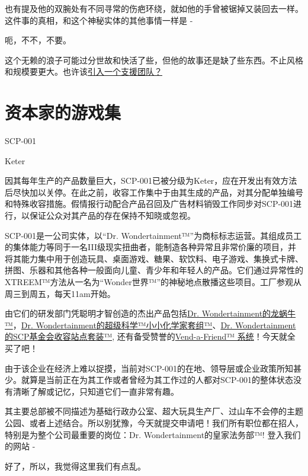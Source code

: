 也有提及他的双腕处有不同寻常的伤疤环绕，就如他的手曾被锯掉又装回去一样。这件事的真相，和这个神秘实体的其他事情一样是 -

呃，不不，不要。

这个无赖的浪子可能过分世故和快活了些，但他的故事还是缺了些东西。不止风格和规模要更大。也许该\hyperref[sec:SCP-001.a.simple.toymaker.offset.2]{引入一个支援团队？}

\newpage

\section{资本家的游戏集}

\label{sec:SCP-001.a.simple.toymaker.offset.2}

SCP-001

Keter

因其每年生产的产品数量巨大，SCP-001已被分级为Keter，应在开发出有效方法后尽快加以关停。在此之前，收容工作集中于由其生成的产品，对其分配单独编号和特殊收容措施。假情报行动配合产品召回及广告材料销毁工作同步对SCP-001进行，以保证公众对其产品的存在保持不知晓或忽视。

SCP-001是一公司实体，以“Dr. Wondertainment™”为商标标志运营。其组成员工的集体能力等同于一名III级现实扭曲者，能制造各种异常且非常价廉的项目，并将其能力集中用于创造玩具、桌面游戏、糖果、软饮料、电子游戏、集换式卡牌、拼图、乐器和其他各种一般面向儿童、青少年和年轻人的产品。它们通过异常性的XTREEM™方法从一名为“Wonder世界™”的神秘地点散播这些项目。工厂参观从周三到周五，每天11am开始。

由它们的研发部门凭聪明才智创造的杰出产品包括\hyperref[chap:SCP-111]{Dr. Wondertainment的龙蜗牛™}，\hyperref[chap:SCP-1224]{Dr. Wondertainment的超级科学™小小化学家套组™}、\hyperref[chap:SCP-2228]{Dr. Wondertainment的SCP基金会收容站点套装™}, 还有备受赞誉的\hyperref[chap:]{Vend-a-Friend™ 系统}！今天就全买了吧！

由于该企业在经济上难以捉摸，当前对SCP-001的在地、领导层或企业政策所知甚少。就算是当前正在为其工作或者曾经为其工作过的人都对SCP-001的整体状态没有清晰了解或记忆，只知道它们一直非常有趣。

其主要总部被不同描述为基础行政办公室、超大玩具生产厂、过山车不会停的主题公园、或者上述结合。所以别犹豫，今天就提交申请吧！我们所有职位都在招人，特别是为整个公司最重要的岗位：Dr. Wondertainment的皇家法务部™! 登入我们的网站 -

好了，所以，我觉得这里我们有点乱。

